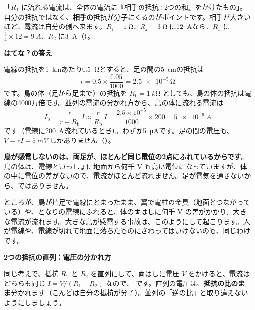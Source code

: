 \begin{phyomi}[$I_1=\dfrac{R_2}{R_1+R_2}\,I$]
「$R_1$ に流れる電流は、全体の電流に『相手の抵抗÷2つの和』をかけたもの」。自分の抵抗ではなく、\textbf{相手の}抵抗が分子にくるのがポイントです。相手が大きいほど、電流は自分の側へ来ます。$R_1=\qty{1}{\ohm}$、$R_2=\qty{3}{\ohm}$ に\qty{12}{A}なら、$R_1$ に $\tfrac34\times12=\qty{9}{A}$、$R_2$ に\qty{3}{A}（）。
\end{phyomi}

\noindent\textbf{はてな？の答え}\par\nobreak
電線の抵抗を\qty{1}{km}あたり\qty{0.5}{\ohm}とすると、足の間の\qty{5}{cm}の抵抗は
\[ r=0.5\times\frac{0.05}{1000}=\qty{2.5e-5}{\ohm} \]
です。鳥の体（足から足まで）の抵抗を $R_{\mathrm b}=\qty{1}{k\ohm}$ としても、鳥の体の抵抗は電線の4000万倍です。並列の電流の分かれ方から、鳥の体に流れる電流は
\[ I_{\mathrm b}=\frac{r}{r+R_{\mathrm b}}\,I\approx\frac{r}{R_{\mathrm b}}\,I=\frac{2.5\times10^{-5}}{1000}\times200=\qty{5e-6}{A} \]
です（電線に\qty{200}{A}流れているとき）。わずか\qty{5}{\micro A}です。足の間の電圧も、$V=rI=\qty{5}{mV}$ しかありません（）。

\textbf{鳥が感電しないのは、両足が、ほとんど同じ電位の2点にふれているからです}。鳥の体は、電線といっしょに地面から何千 V も高い電位になっていますが、体の中に電位の差がないので、電流がほとんど流れません。足が電気を通さないから、ではありません。

ところが、鳥が片足で電線にとまったまま、翼で電柱の金具（地面とつながっている）や、となりの電線にふれると、体の両はしに何千 V の差がかかり、大きな電流が流れます。大きな鳥が感電する事故は、このようにして起こります。人が電線や、電線が切れて地面に落ちたものにさわってはいけないのも、同じわけです。

\begin{phmodel}[電線にとまった鳥]
\end{phmodel}

\noindent\textbf{2つの抵抗の直列：電圧の分かれ方}\par\nobreak
同じ考えで、抵抗 $R_1$ と $R_2$ を直列にして、両はしに電圧 $V$ をかけると、電流はどちらも同じ $I=V/(R_1+R_2)$ なので、
\label{ph:電-5:bunatsu}です。直列の電圧は、\textbf{抵抗の比のまま}分かれます（こんどは自分の抵抗が分子）。並列の「逆の比」と取り違えないようにしましょう。

